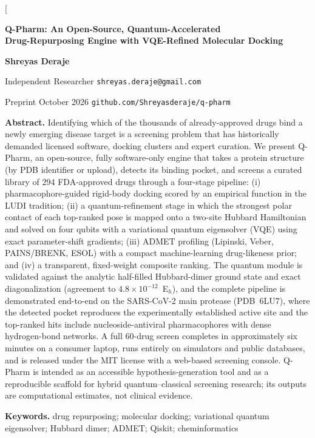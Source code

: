 \documentclass[10pt,a4paper,twocolumn]{article}
\begin{document}
\twocolumn[
\begin{@twocolumnfalse}
\begin{center}
{\LARGE\bfseries\color{prespdf} Q-Pharm: An Open-Source, Quantum-Accelerated\\[3pt]
Drug-Repurposing Engine with VQE-Refined Molecular Docking\par}
\vspace{11pt}
{\normalsize\textbf{Shreyas Deraje}}\par
\vspace{2pt}
{\small Independent Researcher \;\textperiodcentered\; \texttt{shreyas.deraje@gmail.com}\par}
\vspace{4pt}
{\small\color{presgrey} Preprint \textperiodcentered\; October 2026 \textperiodcentered\;
\texttt{github.com/Shreyasderaje/q-pharm}\par}
\vspace{12pt}
\begin{minipage}{0.92\textwidth}
\small
\textbf{Abstract.}
Identifying which of the thousands of already-approved drugs bind a newly emerging disease
target is a screening problem that has historically demanded licensed software, docking
clusters and expert curation. We present Q-Pharm, an open-source, fully software-only
engine that takes a protein structure (by PDB identifier or upload), detects its binding
pocket, and screens a curated library of 294 FDA-approved drugs through a four-stage
pipeline: (i) pharmacophore-guided rigid-body docking scored by an empirical function in
the LUDI tradition; (ii) a quantum-refinement stage in which the strongest polar contact of
each top-ranked pose is mapped onto a two-site Hubbard Hamiltonian and solved on four
qubits with a variational quantum eigensolver (VQE) using exact parameter-shift gradients;
(iii) ADMET profiling (Lipinski, Veber, PAINS/BRENK, ESOL) with a compact machine-learning
drug-likeness prior; and (iv) a transparent, fixed-weight composite ranking. The quantum
module is validated against the analytic half-filled Hubbard-dimer ground state and exact
diagonalization (agreement to $4.8\times10^{-12}$~E$_h$), and the complete pipeline is
demonstrated end-to-end on the SARS-CoV-2 main protease (PDB~6LU7), where the detected
pocket reproduces the experimentally established active site and the top-ranked hits
include nucleoside-antiviral pharmacophores with dense hydrogen-bond networks. A full
60-drug screen completes in approximately six minutes on a consumer laptop, runs entirely
on simulators and public databases, and is released under the MIT license with a web-based
screening console. Q-Pharm is intended as an accessible hypothesis-generation tool and as
a reproducible scaffold for hybrid quantum--classical screening research; its outputs are
computational estimates, not clinical evidence.
\vspace{6pt}

\textbf{Keywords.} drug repurposing; molecular docking; variational quantum eigensolver;
Hubbard dimer; ADMET; Qiskit; cheminformatics
\end{minipage}
\end{center}
\vspace{16pt}
\end{@twocolumnfalse}
\end{document}

